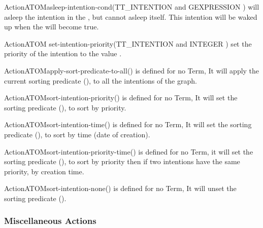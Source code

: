 \begin{typeefa}{Action}{ATOM}{asleep-intention-cond}{(TT\_INTENTION and
GEXPRESSION )}
will asleep the intention in the , but cannot asleep itself.
This intention will be waked up when the  will become true.
\end{typeefa}

\begin{typeefa}{Action}{ATOM} {set-intention-priority}{(TT\_INTENTION and
INTEGER )}
set  the priority of the intention to the value .
\end{typeefa}

\begin{typeefa}{Action}{ATOM}{apply-sort-predicate-to-all}{()}
is defined for no Term, It will apply the current sorting predicate
(), to all the intentions of the
graph. 
\end{typeefa}

\begin{typeefa}{Action}{ATOM}{sort-intention-priority}{()}
is defined for no Term, It will set the sorting predicate (), to sort by priority. 
\end{typeefa}

\begin{typeefa}{Action}{ATOM}{sort-intention-time}{()}
is defined for no Term, It will set the sorting predicate (), to sort by time (date of 
creation).
\end{typeefa}

\begin{typeefa}{Action}{ATOM}{sort-intention-priority-time}{()}
is defined for no Term, it will set the sorting predicate (), to sort by priority then if two intentions have the
same priority, by creation time. 
\end{typeefa}

\begin{typeefa}{Action}{ATOM}{sort-intention-none}{()}
is defined for no Term, It will unset the sorting predicate (). 
\end{typeefa}

\subsubsection{Miscellaneous Actions}


